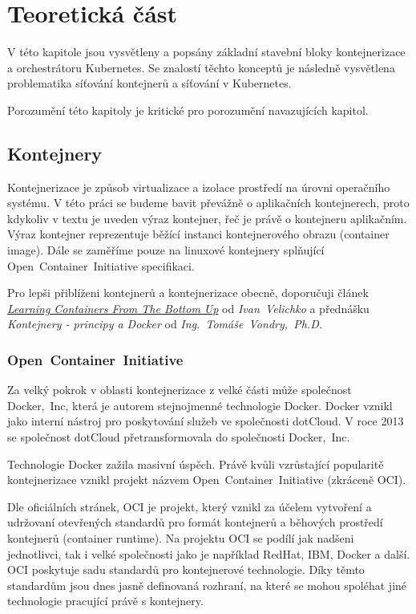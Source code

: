 \chapter{Teoretická část}
\begin{chapterabstract}
V této kapitole jsou vysvětleny a popsány základní stavební bloky kontejnerizace a orchestrátoru Kubernetes. Se znalostí těchto konceptů je následně vysvětlena problematika síťování kontejnerů a síťování v Kubernetes.  

Porozumění této kapitoly je kritické pro porozumění navazujících kapitol.
\end{chapterabstract}

\section{Kontejnery}
Kontejnerizace je způsob virtualizace a izolace prostředí na úrovni operačního systému. V této práci se budeme bavit převážně o aplikačních kontejnerech, proto kdykoliv v textu je uveden výraz kontejner, řeč je právě o kontejneru aplikačním. Výraz kontejner reprezentuje běžící instanci kontejnerového obrazu (container image). Dále se zaměříme pouze na linuxové kontejnery splňující Open~Container~Initiative specifikaci.

Pro lepši přiblíženi kontejnerů a kontejnerizace obecně, doporučuji článek \href{https://iximiuz.com/en/posts/container-learning-path/}{\textit{Learning Containers From The Bottom Up}} od \textit{Ivan~Velichko} a přednášku \textit{Kontejnery - principy a Docker} od \textit{Ing.~Tomáše~Vondry,~Ph.D.}
\subsection{Open~Container~Initiative}
Za velký pokrok v oblasti kontejnerizace z velké části může společnost Docker,~Inc, která je autorem stejnojmenné technologie Docker. Docker vznikl jako interní nástroj pro poskytování služeb ve společnosti dotCloud. V roce 2013 se společnost dotCloud přetransformovala do společnosti Docker,~Inc. \cite{poulton_2020_docker}

Technologie Docker zažila masivní úspěch. Právě kvůli vzrůstající popularitě kontejnerizace vznikl projekt názvem Open~Container~Initiative (zkráceně OCI).

Dle oficiálních stránek, OCI je projekt, který vznikl za účelem vytvoření a udržovaní otevřených standardů pro formát kontejnerů a běhových prostředí kontejnerů (container runtime). Na projektu OCI se podílí jak nadšeni jednotlivci, tak i velké společnosti jako je například RedHat, IBM, Docker a další. OCI poskytuje sadu standardů pro kontejnerové technologie. Díky těmto standardům jsou dnes jasně definovaná rozhraní, na které se mohou spoléhat jiné technologie pracující právě s kontejnery.\cite{thelinuxfoundation_about}

